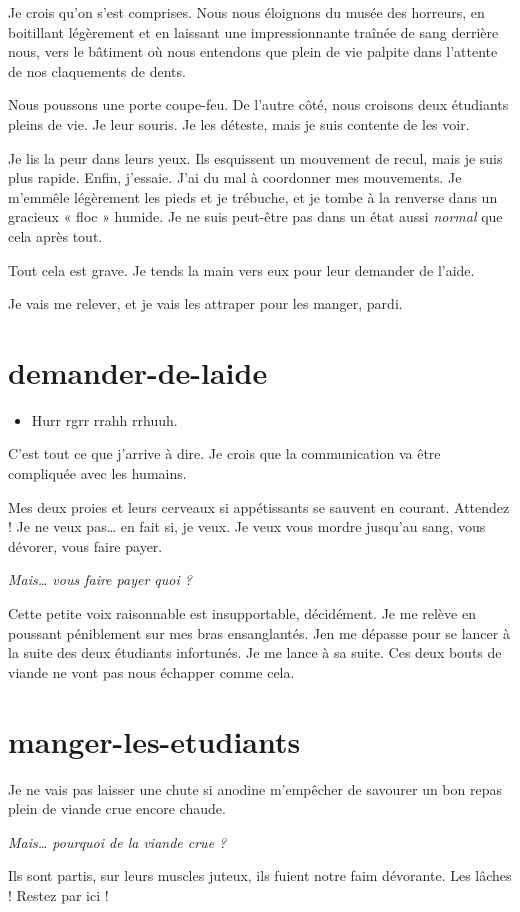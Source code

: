 Je crois qu'on s'est comprises. Nous nous éloignons du musée des horreurs, en boitillant légèrement et en laissant une impressionnante traînée de sang derrière nous, vers le bâtiment où nous entendons que plein de vie palpite dans l'attente de nos claquements de dents.

Nous poussons une porte coupe-feu. De l'autre côté, nous croisons deux étudiants pleins de vie. Je leur souris. Je les déteste, mais je suis contente de les voir.

Je lis la peur dans leurs yeux. Ils esquissent un mouvement de recul, mais je suis plus rapide. Enfin, j'essaie. J'ai du mal à coordonner mes mouvements. Je m'emmêle légèrement les pieds et je trébuche, et je tombe à la renverse dans un gracieux « floc » humide. Je ne suis peut-être pas dans un état aussi \textit{normal} que cela après tout.

\item Tout cela est grave. Je tends la main vers eux pour leur demander de l'aide. 
\item Je vais me relever, et je vais les attraper pour les manger, pardi. 
\enw

\section{demander-de-laide}

\begin{itemize}
\item Hurr rgrr rrahh rrhuuh.
\end{itemize}

C'est tout ce que j'arrive à dire. Je crois que la communication va être compliquée avec les humains.

Mes deux proies et leurs cerveaux si appétissants se sauvent en courant. Attendez ! Je ne veux pas… en fait si, je veux. Je veux vous mordre jusqu'au sang, vous dévorer, vous faire payer.

\textit{Mais… vous faire payer quoi ?}

Cette petite voix raisonnable est insupportable, décidément. Je me relève en poussant péniblement sur mes bras ensanglantés. Jen me dépasse pour se lancer à la suite des deux étudiants infortunés. Je me lance à sa suite. Ces deux bouts de viande ne vont pas nous échapper comme cela.

\section{manger-les-etudiants} 

Je ne vais pas laisser une chute si anodine m'empêcher de savourer un bon repas plein de viande crue encore chaude.

\textit{Mais… pourquoi de la viande crue ?}

Ils sont partis, sur leurs muscles juteux, ils fuient notre faim dévorante. Les lâches ! Restez par ici !